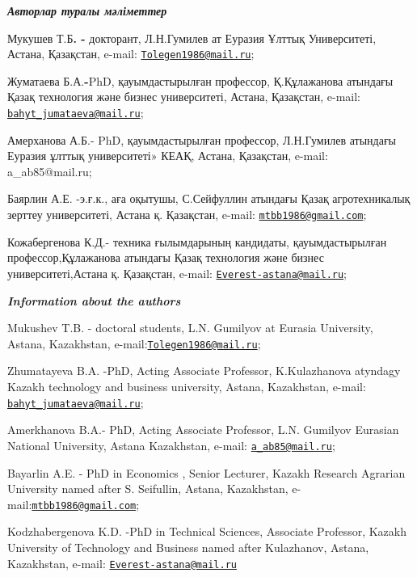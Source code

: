 \begin{authorinfo}
\emph{{\bfseries Авторлар туралы мәліметтер}}

Мукушев Т.Б{\bfseries . -} докторант, Л.Н.Гумилев ат Еуразия Ұлттық
Университеті, Астана, Қазақстан, e-mail:
\href{mailto:Tolegen1986@mail.ru}{\nolinkurl{Tolegen1986@mail.ru}};

Жуматаева Б.А.{\bfseries -}PhD, қауымдастырылған профессор, Қ.Құлажанова
атындағы Қазақ технология және бизнес университеті, Астана, Қазақстан,
e-mail:
\href{mailto:bahyt_jumataeva@mail.ru}{\nolinkurl{bahyt\_jumataeva@mail.ru}};

Амерханова А.Б.- PhD, қауымдастырылған профессор, Л.Н.Гумилев атындағы
Еуразия ұлттық университеті» КЕАҚ, Астана, Қазақстан, e-mail:
a\_ab85@mail.ru;

Баярлин А.Е. -э.ғ.к., аға оқытушы, С.Сейфуллин атындағы Қазақ
агротехникалық зерттеу университеті, Астана қ. Қазақстан, e-mail:
\href{mailto:mtbb1986@gmail.com}{\nolinkurl{mtbb1986@gmail.com}};

Кожабергенова К.Д.- техника ғылымдарының кандидаты, қауымдастырылған
профессор,Құлажанова атындағы Қазақ технология және бизнес
университеті,Астана қ. Қазақстан, e-mail:
\href{mailto:Everest-astana@mail.ru}{\nolinkurl{Everest-astana@mail.ru}};

\emph{{\bfseries Information about the authors}}

Mukushev T.B. - doctoral students, L.N. Gumilyov at Eurasia University,
Astana, Kazakhstan,
e-mail:\href{mailto:Tolegen1986@mail.ru}{\nolinkurl{Tolegen1986@mail.ru}};

Zhumatayeva B.A. -PhD, Acting Associate Professor, K.Kulazhanova
atyndagy Kazakh technology and business university, Astana, Kazakhstan,
e-mail:
\href{mailto:bahyt_jumataeva@mail.ru}{\nolinkurl{bahyt\_jumataeva@mail.ru}};

Amerkhanova B.A.- PhD, Acting Associate Professor, L.N. Gumilyov
Eurasian National University, Astana Kazakhstan, e-mail:
\href{mailto:a_ab85@mail.ru}{\nolinkurl{a\_ab85@mail.ru}};

Bayarlin A.E. - PhD in Economics , Senior Lecturer, Kazakh Research
Agrarian University named after S. Seifullin, Astana, Kazakhstan,
e-mail:\href{mailto:mtbb1986@gmail.com}{\nolinkurl{mtbb1986@gmail.com}};

Kodzhabergenova K.D. -PhD in Technical Sciences, Associate Professor,
Kazakh University of Technology and Business named after Kulazhanov,
Astana, Kazakhstan, e-mail:
\href{mailto:Everest-astana@mail.ru}{\nolinkurl{Everest-astana@mail.ru}}
\end{authorinfo}
